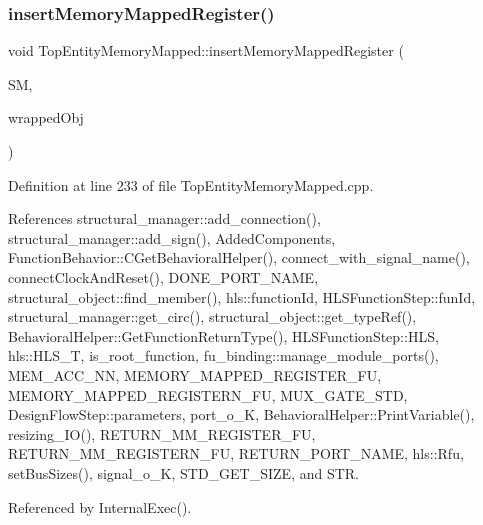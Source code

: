\subsubsection{\texorpdfstring{insert\+Memory\+Mapped\+Register()}{insertMemoryMappedRegister()}}
{\footnotesize\ttfamily void Top\+Entity\+Memory\+Mapped\+::insert\+Memory\+Mapped\+Register (\begin{DoxyParamCaption}\item[{\hyperlink{structural__manager_8hpp_ab3136f0e785d8535f8d252a7b53db5b5}{structural\+\_\+manager\+Ref}}]{SM,  }\item[{\hyperlink{structural__objects_8hpp_a8ea5f8cc50ab8f4c31e2751074ff60b2}{structural\+\_\+object\+Ref}}]{wrapped\+Obj }\end{DoxyParamCaption})\hspace{0.3cm}{\ttfamily [private]}}



Definition at line 233 of file Top\+Entity\+Memory\+Mapped.\+cpp.



References structural\+\_\+manager\+::add\+\_\+connection(), structural\+\_\+manager\+::add\+\_\+sign(), Added\+Components, Function\+Behavior\+::\+C\+Get\+Behavioral\+Helper(), connect\+\_\+with\+\_\+signal\+\_\+name(), connect\+Clock\+And\+Reset(), D\+O\+N\+E\+\_\+\+P\+O\+R\+T\+\_\+\+N\+A\+ME, structural\+\_\+object\+::find\+\_\+member(), hls\+::function\+Id, H\+L\+S\+Function\+Step\+::fun\+Id, structural\+\_\+manager\+::get\+\_\+circ(), structural\+\_\+object\+::get\+\_\+type\+Ref(), Behavioral\+Helper\+::\+Get\+Function\+Return\+Type(), H\+L\+S\+Function\+Step\+::\+H\+LS, hls\+::\+H\+L\+S\+\_\+T, is\+\_\+root\+\_\+function, fu\+\_\+binding\+::manage\+\_\+module\+\_\+ports(), M\+E\+M\+\_\+\+A\+C\+C\+\_\+\+NN, M\+E\+M\+O\+R\+Y\+\_\+\+M\+A\+P\+P\+E\+D\+\_\+\+R\+E\+G\+I\+S\+T\+E\+R\+\_\+\+FU, M\+E\+M\+O\+R\+Y\+\_\+\+M\+A\+P\+P\+E\+D\+\_\+\+R\+E\+G\+I\+S\+T\+E\+R\+N\+\_\+\+FU, M\+U\+X\+\_\+\+G\+A\+T\+E\+\_\+\+S\+TD, Design\+Flow\+Step\+::parameters, port\+\_\+o\+\_\+K, Behavioral\+Helper\+::\+Print\+Variable(), resizing\+\_\+\+I\+O(), R\+E\+T\+U\+R\+N\+\_\+\+M\+M\+\_\+\+R\+E\+G\+I\+S\+T\+E\+R\+\_\+\+FU, R\+E\+T\+U\+R\+N\+\_\+\+M\+M\+\_\+\+R\+E\+G\+I\+S\+T\+E\+R\+N\+\_\+\+FU, R\+E\+T\+U\+R\+N\+\_\+\+P\+O\+R\+T\+\_\+\+N\+A\+ME, hls\+::\+Rfu, set\+Bus\+Sizes(), signal\+\_\+o\+\_\+K, S\+T\+D\+\_\+\+G\+E\+T\+\_\+\+S\+I\+ZE, and S\+TR.



Referenced by Internal\+Exec().

